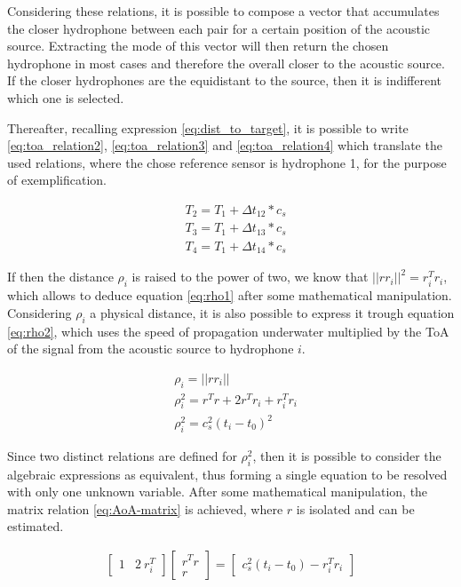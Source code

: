Considering these relations, it is possible to compose a vector that accumulates the closer hydrophone between each pair for a certain position of the acoustic source. Extracting the mode of this vector will then return the chosen hydrophone in most cases and therefore the overall closer to the acoustic source. If the closer hydrophones are the equidistant to the source, then it is indifferent which one is selected.  

Thereafter, recalling expression \ref{eq:dist_to_target}, it is possible to write \ref{eq:toa_relation2}, \ref{eq:toa_relation3} and \ref{eq:toa_relation4} which translate the used relations, where  the chose reference sensor is hydrophone 1, for the purpose of exemplification.

\begin{eqnarray}
	& T_2 = T_1 + \Delta t_{12} * c_s
	\label{eq:toa_relation2}\\
	& T_3 = T_1 + \Delta t_{13} * c_s
	\label{eq:toa_relation3}\\
	& T_4 = T_1 + \Delta t_{14} * c_s
	\label{eq:toa_relation4}
\end{eqnarray}

If then the distance $\rho_i$ is raised to the power of two, we know that $||rr_i||^2 = r_i^{T}r_i$, which allows to deduce equation \ref{eq:rho1} after some mathematical manipulation. Considering $\rho_i$ a physical distance, it is also possible to express it trough equation \ref{eq:rho2}, which uses the speed of propagation underwater multiplied by the ToA of the signal from the acoustic source to hydrophone $i$.

\begin{eqnarray}
	& \rho_i = ||rr_i|| 
	\label{eq:rho}\\
	&\rho_i^{2} =  r^{T}r + 2r^{T}r_i + r_i^{T}r_i
	\label{eq:rho1}\\
	&\rho_i^{2} = c_s^{2} (t_i-t_0)^{2}
	\label{eq:rho2}
\end{eqnarray}

Since two distinct relations are defined for $\rho_i^{2}$, then it is possible to consider the algebraic expressions as equivalent, thus forming a single equation to be resolved with only one unknown variable. After some mathematical manipulation, the matrix relation \ref{eq:AoA-matrix} is achieved, where $r$ is isolated and can be estimated.

\begin{eqnarray}
	\begin{bmatrix}
		1 & 2\: r_i^{T}
	\end{bmatrix}
	\begin{bmatrix}
		r^{T} r \\
		r
	\end{bmatrix}
	=  
	\begin{bmatrix}
		c_s^{2} (t_i-t_0) - r_i^{T} r_i
	\end{bmatrix}
	\label{eq:AoA-matrix}
\end{eqnarray}

